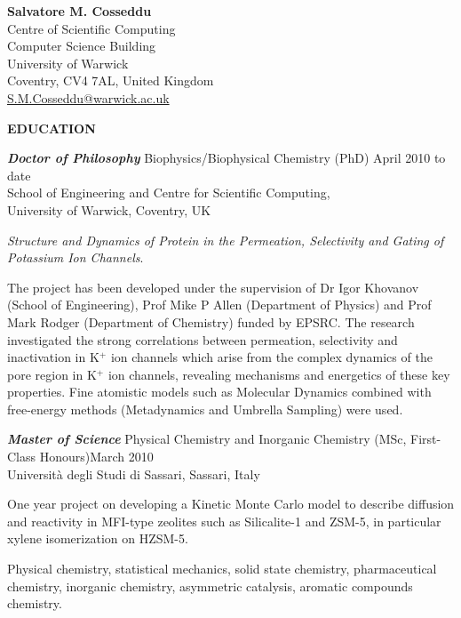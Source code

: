 \documentclass[a4paper,10pt,final]{memoir}
\newcommand{\Sep}{\vspace{1.em}}
\newcommand{\SmallSep}{\vspace{0.3em}}
\newcommand{\CVSection}[1]
	{\Large\textbf{#1}\par
	\SmallSep\normalsize\normalfont}
\newcommand{\CVItem}[2]
	{\textit{\textbf{\color{RoyalBlue} #1}} #2}
\begin{document}
\Huge {\bfseries \color{RoyalBlue} Salvatore M. Cosseddu} \\
\small
Centre of Scientific Computing \\
Computer Science Building \\
University of Warwick \\
Coventry, CV4 7AL, United Kingdom \\
\url{S.M.Cosseddu@warwick.ac.uk}
\normalsize\normalfont
\SmallSep
\Sep

\CVSection{EDUCATION}
\CVItem{ Doctor of Philosophy}{Biophysics/Biophysical Chemistry (PhD) \hfill April 2010 to date} \\
School of Engineering and Centre for Scientific Computing, \\
University of Warwick, Coventry, UK %
\begin{description} [style=multiline,leftmargin=3cm,font=\normalfont] \itemsep -2pt
\item [Thesis:] \textit{Structure and Dynamics of Protein in the Permeation, Selectivity
    and Gating of Potassium Ion Channels}.
\item [Research description:] The project has been developed under the supervision of Dr
  Igor Khovanov (School of Engineering), Prof Mike P Allen (Department of Physics) and
  Prof Mark Rodger (Department of Chemistry) funded by EPSRC. The research investigated
  the strong correlations between permeation, selectivity and inactivation in K$^+$ ion
  channels which arise from the complex dynamics of the pore region in K$^+$ ion channels,
  revealing mechanisms and energetics of these key properties. Fine atomistic models such
  as Molecular Dynamics combined with free-energy methods (Metadynamics and Umbrella
  Sampling) were used.
\end{description}
\SmallSep

\CVItem{Master of Science}{Physical Chemistry and Inorganic Chemistry (MSc, First-Class Honours)\hfill March 2010}\\
Universit\`a degli Studi di Sassari, Sassari, Italy %
\begin{description} [style=multiline,leftmargin=3cm,font=\normalfont] \itemsep -2pt
\item [Thesis:] One year project on developing a Kinetic Monte Carlo model to describe
  diffusion and reactivity in MFI-type zeolites such as Silicalite-1 and ZSM-5, in
  particular xylene
  isomerization on HZSM-5.
\item[Main subjects:] Physical chemistry, statistical mechanics, solid state chemistry,
  pharmaceutical chemistry, inorganic chemistry, asymmetric catalysis, aromatic compounds
  chemistry. 
\end{description}
\SmallSep
 
\end{document}
